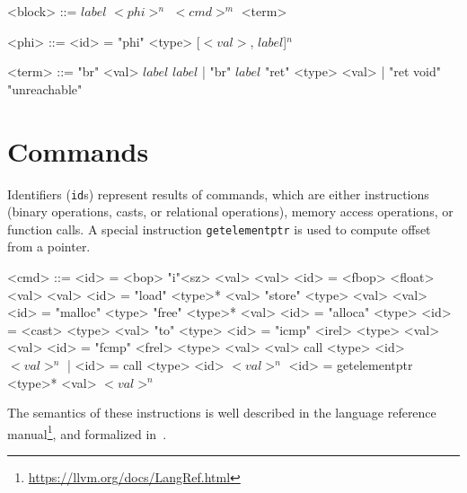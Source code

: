 \begin{grammar}

<block> ::= $label$ $<phi>^n$ $<cmd>^m$ <term>

<phi> ::= <id> = "phi" <type> [$<val>$, $label$]$^n$

<term> ::= "br" <val> $label$ $label$  | "br" $label$
    \alt "ret" <type> <val> | "ret void"
    \alt "unreachable"
\end{grammar}

\section*{Commands}

Identifiers (\texttt{id}s) represent results of \llvm commands, which are either
\ssa instructions (binary operations, casts, or relational operations), memory
access operations, or function calls. A special instruction
\texttt{getelementptr} is used to compute offset from a pointer.

\begin{grammar}
<cmd> ::= <id> = <bop> "i"<sz> <val> <val>
    \alt <id> = <fbop> <float> <val> <val>
    \alt <id> = "load" <type>* <val>
    \alt "store" <type> <val> <val>
    \alt <id> = "malloc" <type>
    \alt "free" <type>* <val>
    \alt <id> = "alloca" <type>
    \alt <id> = <cast> <type> <val> "to" <type>
    \alt <id> = "icmp" <irel> <type> <val> <val>
    \alt <id> = "fcmp" <frel> <type> <val> <val>
    \alt call <type> <id> $<val>^n$ | <id> = call <type> <id> $<val>^n$
    \alt <id> = getelementptr <type>* <val> $<val>^n$
\end{grammar}

\noindent
The semantics of these instructions is well described in the \llvm language
reference manual\footnote{\url{https://llvm.org/docs/LangRef.html}}, and formalized in~\cite{Zhao2012}.
